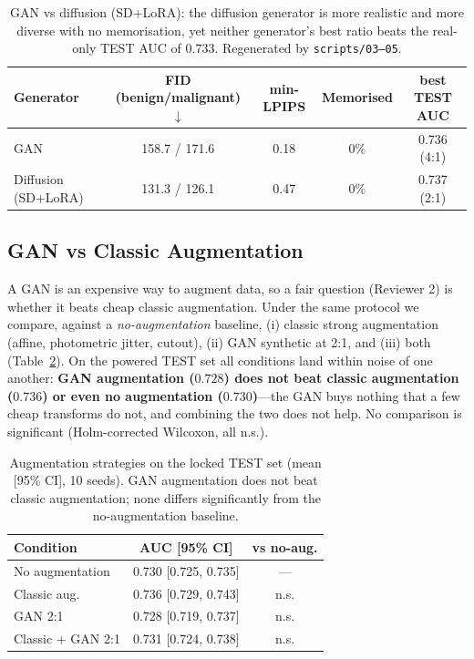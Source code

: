 \documentclass[runningheads]{llncs}
\begin{document}
\begin{table}[t]
\centering
\caption{GAN vs diffusion (SD+LoRA): the diffusion generator is more realistic
and more diverse with no memorisation, yet neither generator's best ratio beats
the real-only TEST AUC of $0.733$. Regenerated by \texttt{scripts/03--05}.}
\label{tab:diffusion}
\begin{tabular}{lcccc}
\toprule
Generator & FID (benign/malignant) $\downarrow$ & min-LPIPS & Memorised & best TEST AUC \\
\midrule
GAN & 158.7 / 171.6 & 0.18 & 0\% & 0.736 (4:1) \\
Diffusion (SD+LoRA) & 131.3 / 126.1 & 0.47 & 0\% & 0.737 (2:1) \\
\bottomrule
\end{tabular}
\end{table}

\subsection{GAN vs Classic Augmentation}
A GAN is an expensive way to augment data, so a fair question (Reviewer 2) is
whether it beats cheap classic augmentation. Under the same protocol we compare,
against a \emph{no-augmentation} baseline, (i) classic strong augmentation
(affine, photometric jitter, cutout), (ii) GAN synthetic at 2:1, and (iii) both
(Table~\ref{tab:augcompare}). On the powered TEST set all conditions land within
noise of one another: \textbf{GAN augmentation ($0.728$) does not beat classic
augmentation ($0.736$) or even no augmentation ($0.730$)}---the GAN buys nothing
that a few cheap transforms do not, and combining the two does not help. No
comparison is significant (Holm-corrected Wilcoxon, all n.s.).

\begin{table}[t]
\centering
\caption{Augmentation strategies on the locked TEST set (mean [95\% CI], 10
seeds). GAN augmentation does not beat classic augmentation; none differs
significantly from the no-augmentation baseline.}
\label{tab:augcompare}
\begin{tabular}{lcc}
\toprule
Condition & AUC [95\% CI] & vs no-aug. \\
\midrule
No augmentation & 0.730 [0.725, 0.735] & --- \\
Classic aug. & 0.736 [0.729, 0.743] & n.s. \\
GAN 2:1 & 0.728 [0.719, 0.737] & n.s. \\
Classic + GAN 2:1 & 0.731 [0.724, 0.738] & n.s. \\
\bottomrule
\end{tabular}
\end{table}
\end{document}
